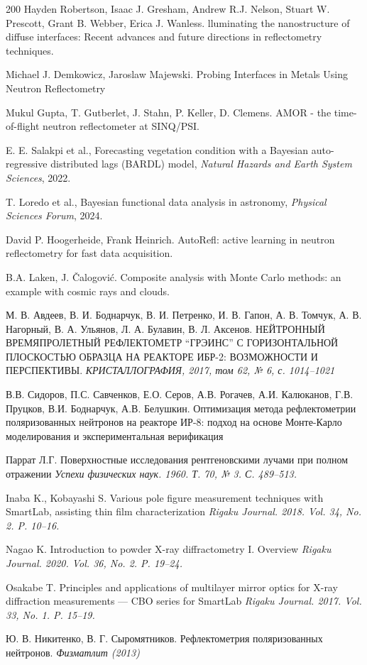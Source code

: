 \documentclass[a4paper]{article}
\begin{document}
\begin{thebibliography}{200}
 Hayden Robertson, Isaac J. Gresham, Andrew R.J. Nelson, Stuart W. Prescott, Grant B. Webber, Erica J. Wanless. lluminating the nanostructure of diffuse interfaces: Recent advances and
future directions in reflectometry techniques.

 Michael J. Demkowicz, Jaroslaw Majewski. Probing Interfaces in Metals Using Neutron Reflectometry 

 Mukul Gupta, T. Gutberlet, J. Stahn, P. Keller, D. Clemens. AMOR - the time-of-flight neutron reflectometer at SINQ/PSI.

 E. E. Salakpi et al., Forecasting vegetation condition with a Bayesian auto-regressive distributed lags (BARDL) model, \textit{Natural Hazards and Earth System Sciences}, 2022.

 T. Loredo et al., Bayesian functional data analysis in astronomy, \textit{Physical Sciences Forum}, 2024.

 David P. Hoogerheide, Frank Heinrich. AutoRefl: active learning in neutron reflectometry
for fast data acquisition.

 B.A. Laken, J. Čalogović. Composite analysis with Monte Carlo methods: an example with cosmic rays and clouds.

 М. В. Авдеев, В. И. Боднарчук, В. И. Петренко, И. В. Гапон, А. В. Томчук, А. В. Нагорный, В. А. Ульянов, Л. А. Булавин, В. Л. Аксенов. НЕЙТРОННЫЙ ВРЕМЯПРОЛЕТНЫЙ РЕФЛЕКТОМЕТР “ГРЭИНС” С ГОРИЗОНТАЛЬНОЙ ПЛОСКОСТЬЮ ОБРАЗЦА НА РЕАКТОРЕ ИБР-2: ВОЗМОЖНОСТИ И ПЕРСПЕКТИВЫ. \textit{КРИСТАЛЛОГРАФИЯ, 2017, том 62, № 6, с. 1014–1021}

 В.В. Сидоров, П.С. Савченков, Е.О. Серов, А.В. Рогачев, А.И. Калюканов, Г.В. Пруцков, В.И. Боднарчук, А.В. Белушкин. Оптимизация метода рефлектометрии поляризованных нейтронов на реакторе ИР-8: подход на основе Монте-Карло моделирования и экспериментальная верификация

 Паррат Л.Г. Поверхностные исследования рентгеновскими лучами при полном отражении \textit{Успехи физических наук. 1960. Т. 70, № 3. С. 489--513.}

 Inaba K., Kobayashi S. Various pole figure measurement techniques with SmartLab, assisting thin film characterization \textit{Rigaku Journal. 2018. Vol. 34, No. 2. P. 10--16.}

 Nagao K. Introduction to powder X-ray diffractometry I. Overview \textit{Rigaku Journal. 2020. Vol. 36, No. 2. P. 19--24.}

 Osakabe T. Principles and applications of multilayer mirror optics for X-ray diffraction measurements — CBO series for SmartLab \textit{Rigaku Journal. 2017. Vol. 33, No. 1. P. 15--19.}

  Ю. В. Никитенко, В. Г. Сыромятников. Рефлектометрия поляризованных нейтронов. \textit{Физматлит (2013)}

\end{thebibliography}
\end{document}
